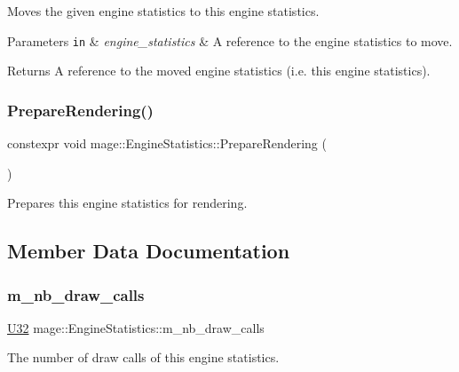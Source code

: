 Moves the given engine statistics to this engine statistics.


\begin{DoxyParams}[1]{Parameters}
\mbox{\tt in}  & {\em engine\+\_\+statistics} & A reference to the engine statistics to move. \\
\hline
\end{DoxyParams}
\begin{DoxyReturn}{Returns}
A reference to the moved engine statistics (i.\+e. this engine statistics). 
\end{DoxyReturn}
\hypertarget{classmage_1_1_engine_statistics_a15eaca9bc77798a83e9c1a51fe6c7933}{}\label{classmage_1_1_engine_statistics_a15eaca9bc77798a83e9c1a51fe6c7933} 
\subsubsection{\texorpdfstring{Prepare\+Rendering()}{PrepareRendering()}}
{\footnotesize\ttfamily constexpr void mage\+::\+Engine\+Statistics\+::\+Prepare\+Rendering (\begin{DoxyParamCaption}{ }\end{DoxyParamCaption})\hspace{0.3cm}{\ttfamily [noexcept]}}

Prepares this engine statistics for rendering. 

\subsection{Member Data Documentation}
\hypertarget{classmage_1_1_engine_statistics_a26eeba872cebff2657b8b023751b1894}{}\label{classmage_1_1_engine_statistics_a26eeba872cebff2657b8b023751b1894} 
\subsubsection{\texorpdfstring{m\+\_\+nb\+\_\+draw\+\_\+calls}{m\_nb\_draw\_calls}}
{\footnotesize\ttfamily \hyperlink{namespacemage_a41c104c036fba3756a74e19f793eeaa1}{U32} mage\+::\+Engine\+Statistics\+::m\+\_\+nb\+\_\+draw\+\_\+calls\hspace{0.3cm}{\ttfamily [private]}}

The number of draw calls of this engine statistics. 